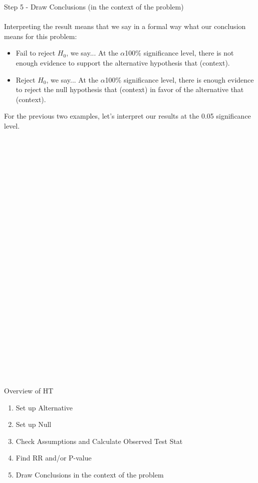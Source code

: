 \newpage

\large Step 5  - Draw Conclusions (in the context of the problem)\normalsize\\~\\

Interpreting the result means that we say in a formal way what our conclusion means for this problem:
\begin{itemize}
\item Fail to reject $H_0$, we say... At the $\alpha$100\% significance level, there is not enough evidence to support the alternative hypothesis that (context).
\item Reject $H_0$, we say... At the $\alpha$100\% significance level, there is enough evidence to reject the null hypothesis that (context) in favor of the alternative that (context).
\end{itemize}
For the previous two examples, let's interpret our results at the 0.05 significance level.  \\~\\~\\~\\~\\~\\~\\~\\~\\~\\~\\~\\~\\~\\~\\~\\~\\~\\~\\~\\~\\~\\~\\~\\~\\~\\~\\

Overview of HT
\begin{enumerate}
\item Set up Alternative
\item Set up Null
\item Check Assumptions and Calculate Observed Test Stat
\item Find RR and/or P-value
\item Draw Conclusions in the context of the problem
\end{enumerate}

